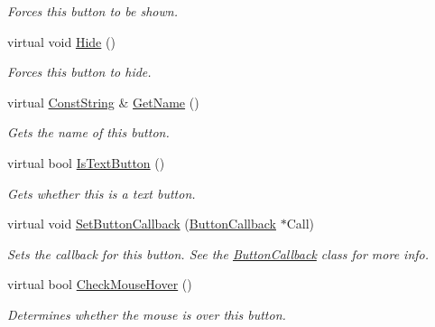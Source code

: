 \begin{DoxyCompactItemize}
\begin{DoxyCompactList}\small\item\em Forces this button to be shown. \item\end{DoxyCompactList}\item 
\hypertarget{classphys_1_1UI_1_1Button_a5a68803daf10281a85b4db1d4c18e412}{
virtual void \hyperlink{classphys_1_1UI_1_1Button_a5a68803daf10281a85b4db1d4c18e412}{Hide} ()}
\label{d8/d88/classphys_1_1UI_1_1Button_a5a68803daf10281a85b4db1d4c18e412}

\begin{DoxyCompactList}\small\item\em Forces this button to hide. \item\end{DoxyCompactList}\item 
virtual \hyperlink{namespacephys_a5ce5049f8b4bf88d6413c47b504ebb31}{ConstString} \& \hyperlink{classphys_1_1UI_1_1Button_a1b757862cd1f4935d62c05ef4596b8a0}{GetName} ()
\begin{DoxyCompactList}\small\item\em Gets the name of this button. \item\end{DoxyCompactList}\item 
virtual bool \hyperlink{classphys_1_1UI_1_1Button_a9c575f6433a5a455dc8c5de73d37839c}{IsTextButton} ()
\begin{DoxyCompactList}\small\item\em Gets whether this is a text button. \item\end{DoxyCompactList}\item 
virtual void \hyperlink{classphys_1_1UI_1_1Button_aa9f8c1e2e91e22405bacd298c88eb845}{SetButtonCallback} (\hyperlink{classphys_1_1UI_1_1ButtonCallback}{ButtonCallback} $\ast$Call)
\begin{DoxyCompactList}\small\item\em Sets the callback for this button. See the \hyperlink{classphys_1_1UI_1_1ButtonCallback}{ButtonCallback} class for more info. \item\end{DoxyCompactList}\item 
virtual bool \hyperlink{classphys_1_1UI_1_1Button_a72d76501d15053e3fbd9e7eb933e22de}{CheckMouseHover} ()
\begin{DoxyCompactList}\small\item\em Determines whether the mouse is over this button. \item\end{DoxyCompactList}\item 

\end{DoxyCompactItemize}
